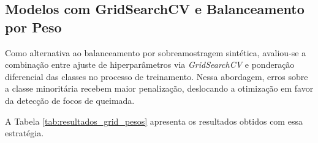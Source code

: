 \subsection{Modelos com GridSearchCV e Balanceamento por Peso}

Como alternativa ao balanceamento por sobreamostragem sintética, avaliou-se a combinação entre ajuste de hiperparâmetros via \textit{GridSearchCV} e ponderação diferencial das classes no processo de treinamento. Nessa abordagem, erros sobre a classe minoritária recebem maior penalização, deslocando a otimização em favor da detecção de focos de queimada.

A Tabela \ref{tab:resultados_grid_pesos} apresenta os resultados obtidos com essa estratégia.

\begingroup
\footnotesize
\setlength{\tabcolsep}{4pt}


